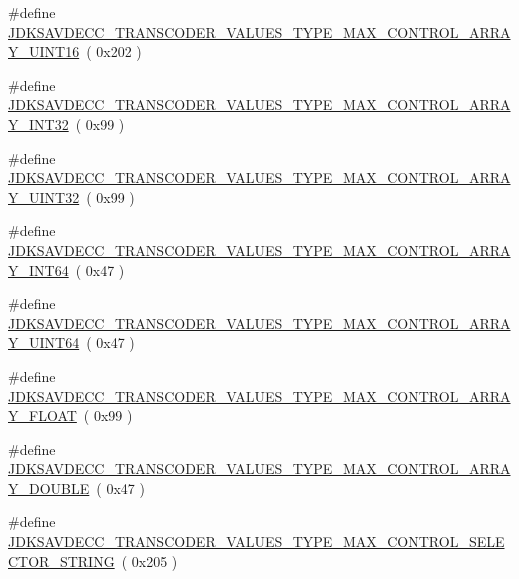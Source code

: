 \begin{DoxyCompactItemize}
\item 
\#define \hyperlink{group__transcoder__values__type__max_gad3602e0c23928563c701d121fe92ba2b}{J\+D\+K\+S\+A\+V\+D\+E\+C\+C\+\_\+\+T\+R\+A\+N\+S\+C\+O\+D\+E\+R\+\_\+\+V\+A\+L\+U\+E\+S\+\_\+\+T\+Y\+P\+E\+\_\+\+M\+A\+X\+\_\+\+C\+O\+N\+T\+R\+O\+L\+\_\+\+A\+R\+R\+A\+Y\+\_\+\+U\+I\+N\+T16}~( 0x202 )
\item 
\#define \hyperlink{group__transcoder__values__type__max_gab4de4f45ad965702fded8f571eddc7f1}{J\+D\+K\+S\+A\+V\+D\+E\+C\+C\+\_\+\+T\+R\+A\+N\+S\+C\+O\+D\+E\+R\+\_\+\+V\+A\+L\+U\+E\+S\+\_\+\+T\+Y\+P\+E\+\_\+\+M\+A\+X\+\_\+\+C\+O\+N\+T\+R\+O\+L\+\_\+\+A\+R\+R\+A\+Y\+\_\+\+I\+N\+T32}~( 0x99 )
\item 
\#define \hyperlink{group__transcoder__values__type__max_gabc92604c3936252be46fc0478c1c8f40}{J\+D\+K\+S\+A\+V\+D\+E\+C\+C\+\_\+\+T\+R\+A\+N\+S\+C\+O\+D\+E\+R\+\_\+\+V\+A\+L\+U\+E\+S\+\_\+\+T\+Y\+P\+E\+\_\+\+M\+A\+X\+\_\+\+C\+O\+N\+T\+R\+O\+L\+\_\+\+A\+R\+R\+A\+Y\+\_\+\+U\+I\+N\+T32}~( 0x99 )
\item 
\#define \hyperlink{group__transcoder__values__type__max_ga3ffe038b3894d396a213c43141c43b15}{J\+D\+K\+S\+A\+V\+D\+E\+C\+C\+\_\+\+T\+R\+A\+N\+S\+C\+O\+D\+E\+R\+\_\+\+V\+A\+L\+U\+E\+S\+\_\+\+T\+Y\+P\+E\+\_\+\+M\+A\+X\+\_\+\+C\+O\+N\+T\+R\+O\+L\+\_\+\+A\+R\+R\+A\+Y\+\_\+\+I\+N\+T64}~( 0x47 )
\item 
\#define \hyperlink{group__transcoder__values__type__max_ga06824cf4799f3566c0219564cd56ac57}{J\+D\+K\+S\+A\+V\+D\+E\+C\+C\+\_\+\+T\+R\+A\+N\+S\+C\+O\+D\+E\+R\+\_\+\+V\+A\+L\+U\+E\+S\+\_\+\+T\+Y\+P\+E\+\_\+\+M\+A\+X\+\_\+\+C\+O\+N\+T\+R\+O\+L\+\_\+\+A\+R\+R\+A\+Y\+\_\+\+U\+I\+N\+T64}~( 0x47 )
\item 
\#define \hyperlink{group__transcoder__values__type__max_gab9d188ed51b04e22ff990b57148722d6}{J\+D\+K\+S\+A\+V\+D\+E\+C\+C\+\_\+\+T\+R\+A\+N\+S\+C\+O\+D\+E\+R\+\_\+\+V\+A\+L\+U\+E\+S\+\_\+\+T\+Y\+P\+E\+\_\+\+M\+A\+X\+\_\+\+C\+O\+N\+T\+R\+O\+L\+\_\+\+A\+R\+R\+A\+Y\+\_\+\+F\+L\+O\+AT}~( 0x99 )
\item 
\#define \hyperlink{group__transcoder__values__type__max_ga30e422374e24bc1aa68e5a0a410b1ac4}{J\+D\+K\+S\+A\+V\+D\+E\+C\+C\+\_\+\+T\+R\+A\+N\+S\+C\+O\+D\+E\+R\+\_\+\+V\+A\+L\+U\+E\+S\+\_\+\+T\+Y\+P\+E\+\_\+\+M\+A\+X\+\_\+\+C\+O\+N\+T\+R\+O\+L\+\_\+\+A\+R\+R\+A\+Y\+\_\+\+D\+O\+U\+B\+LE}~( 0x47 )
\item 
\#define \hyperlink{group__transcoder__values__type__max_ga87ba2394b766dce93e72360cea1aceaf}{J\+D\+K\+S\+A\+V\+D\+E\+C\+C\+\_\+\+T\+R\+A\+N\+S\+C\+O\+D\+E\+R\+\_\+\+V\+A\+L\+U\+E\+S\+\_\+\+T\+Y\+P\+E\+\_\+\+M\+A\+X\+\_\+\+C\+O\+N\+T\+R\+O\+L\+\_\+\+S\+E\+L\+E\+C\+T\+O\+R\+\_\+\+S\+T\+R\+I\+NG}~( 0x205 )

\end{DoxyCompactItemize}

